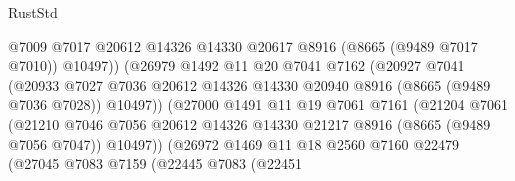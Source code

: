 \begin{lexlean}{RustStd}
\begin{coremodule}
                                    @7009
                                    @7017
                                    @20612
                                    @14326
                                    @14330
                                    @20617
                                    @8916
                                    (@8665 (@9489 @7017 @7010))
                                    @10497))
                                (@26979
                                  @1492
                                  @11
                                  @20
                                  @7041
                                  @7162
                                  (@20927
                                    @7041
                                    (@20933
                                      @7027
                                      @7036
                                      @20612
                                      @14326
                                      @14330
                                      @20940
                                      @8916
                                      (@8665 (@9489 @7036 @7028))
                                      @10497))
                                  (@27000
                                    @1491
                                    @11
                                    @19
                                    @7061
                                    @7161
                                    (@21204
                                      @7061
                                      (@21210
                                        @7046
                                        @7056
                                        @20612
                                        @14326
                                        @14330
                                        @21217
                                        @8916
                                        (@8665 (@9489 @7056 @7047))
                                        @10497))
                                    (@26972
                                      @1469
                                      @11
                                      @18
                                      @2560
                                      @7160
                                      @22479
                                      (@27045
                                        @7083
                                        @7159
                                        (@22445
                                          @7083
                                          (@22451

\end{coremodule}
\end{lexlean}
